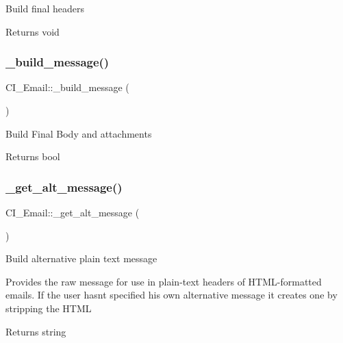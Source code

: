Build final headers

\begin{DoxyReturn}{Returns}
void 
\end{DoxyReturn}
\mbox{\label{class_c_i___email_a720eb0e118e2b4b9d7fb77e4ddb95256}} 
\subsubsection{\texorpdfstring{\+\_\+build\+\_\+message()}{\_build\_message()}}
{\footnotesize\ttfamily C\+I\+\_\+\+Email\+::\+\_\+build\+\_\+message (\begin{DoxyParamCaption}{ }\end{DoxyParamCaption})\hspace{0.3cm}{\ttfamily [protected]}}

Build Final Body and attachments

\begin{DoxyReturn}{Returns}
bool 
\end{DoxyReturn}
\mbox{\label{class_c_i___email_a50b4effe2019c1834101de37c0e39829}} 
\subsubsection{\texorpdfstring{\+\_\+get\+\_\+alt\+\_\+message()}{\_get\_alt\_message()}}
{\footnotesize\ttfamily C\+I\+\_\+\+Email\+::\+\_\+get\+\_\+alt\+\_\+message (\begin{DoxyParamCaption}{ }\end{DoxyParamCaption})\hspace{0.3cm}{\ttfamily [protected]}}

Build alternative plain text message

Provides the raw message for use in plain-\/text headers of H\+T\+M\+L-\/formatted emails. If the user hasn\textquotesingle{}t specified his own alternative message it creates one by stripping the H\+T\+ML

\begin{DoxyReturn}{Returns}
string 
\end{DoxyReturn}
\mbox{\label{class_c_i___email_a992fa75b33c57b4691e4c817ab4bc6fe}} 
